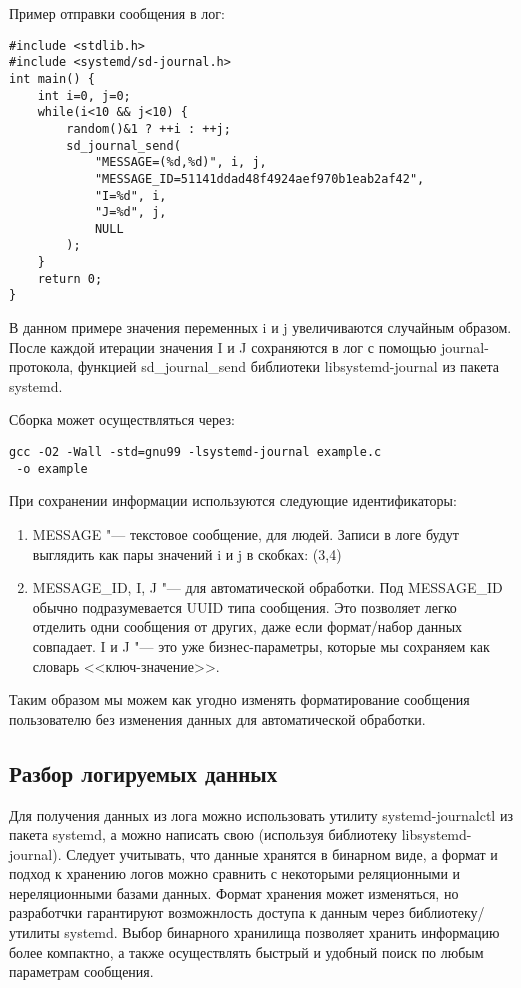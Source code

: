 \documentclass[10pt, a5paper]{article}
\begin{document}
Пример отправки сообщения в лог:

\begin{verbatim}
#include <stdlib.h>
#include <systemd/sd-journal.h>
int main() {
    int i=0, j=0;
    while(i<10 && j<10) {
        random()&1 ? ++i : ++j;
        sd_journal_send(
            "MESSAGE=(%d,%d)", i, j,
            "MESSAGE_ID=51141ddad48f4924aef970b1eab2af42",
            "I=%d", i, 
            "J=%d", j,
            NULL
        );
    }
    return 0;
}
\end{verbatim}

В данном примере значения переменных i и j увеличиваются случайным образом. После каждой итерации значения I и J сохраняются в лог с помощью journal-протокола, функцией sd\_journal\_send библиотеки libsystemd-journal из пакета systemd.

Сборка может осуществляться через:

\begin{verbatim}
gcc -O2 -Wall -std=gnu99 -lsystemd-journal example.c
 -o example
\end{verbatim}

При сохранении информации используются следующие идентификаторы:

\begin{enumerate}
  \item MESSAGE "--- текстовое сообщение, для людей. Записи в логе будут выглядить как пары значений i и j в скобках: (3,4)
  \item MESSAGE\_ID, I, J "--- для автоматической обработки. Под MESSAGE\_ID обычно подразумевается UUID типа сообщения. Это позволяет легко отделить одни сообщения от других, даже если формат/набор данных совпадает. I и J "--- это уже бизнес-параметры, которые мы сохраняем как словарь <<ключ-значение>>.
\end{enumerate}

Таким образом мы можем как угодно изменять форматирование сообщения пользователю без изменения данных для автоматической обработки.

\subsection*{Разбор логируемых данных}

Для получения данных из лога можно использовать утилиту systemd-journalctl из пакета systemd, а можно написать свою (используя библиотеку libsystemd-journal). Следует учитывать, что данные хранятся в бинарном виде, а формат и подход к хранению логов можно сравнить с некоторыми реляционными и нереляционными базами данных. Формат хранения может изменяться, но разработчки гарантируют возможнлость доступа к данным через библиотеку/утилиты systemd. Выбор бинарного хранилища позволяет хранить информацию более компактно, а также осуществлять быстрый и удобный поиск по любым параметрам сообщения.
\end{document}
